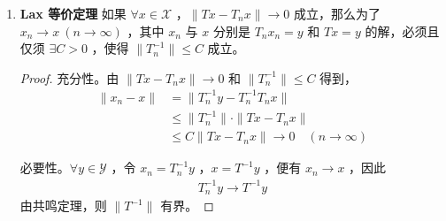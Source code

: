 \begin{enumerate}[leftmargin=2cm, label=\arabic*]
\begin{proof}
(2) $A$ 是满射，先证明 $R(A)$ 是闭的，事实上，$\forall w\in\overline{R}(A)$ ，$\exists v_n\in\mathscr{X}$ 使得 
\begin{equation*}
    w = \lim\limits_{n\to\infty} Av_n
\end{equation*}
则
\begin{align*}
    \delta\|v_{n+p} - v_n\| &\leqslant |a(v_{n+p} - v_n, v_{n+p}-v_n| \\
&= |(v_{n+p} - v_n, A(v_{n+p} - v_n) )|  \\
& \leqslant \|v_{n+p} - v_n\| \cdot \|Av_{n+p} - Av_n\|
\end{align*}
即得
\begin{align*}
    \|v_{n+p} - v_n\| \leqslant \frac{1}{\delta} \|Av_{n+p} - Av_n\| \to 0
\end{align*}
从而 $v_n$ 是基本列，因此 $\exists v^*\in\mathscr{X}$ ，使得 $v_n\to v^*$ ，并且有连续性得 $w = Av^*$ ，即得 $w\in R(A)$ ，于是 $R(A)$ 是闭集。再证明 $R(A)^{\perp} = \{\theta\}$ 。倘若 $w\in R(A)^{\perp}$ ，则
\begin{align*}
    (w, Av) = 0 \quad (\forall v\in\mathscr{X})
\end{align*}
即 $a(w, v) = 0$ ，特别取 $v = w$ ，即得
\begin{align*}
    \delta\|w\|^2 \leqslant |a(w, w)| = 0
\end{align*}
故而 $w =\theta$ ，则 $A$ 为满射。

(3) 再利用 \textbf{Banach 逆算子定理} ，$A^{-1}\in\mathscr{L}(\mathscr{X})$ ，因为
\begin{equation*}
    \delta\|x\|^2 \leqslant |a(x,x)| = |(x, Ax)| \leqslant \|x\| \cdot \|Ax\|
\end{equation*}
所以 $\delta\|x\|\leqslant \|Ax\|$ ，故而 $\|A^{-1}\|\leqslant \frac{1}{\delta}$ 。

\end{proof}
    \item \textbf{Lax 等价定理}  如果 $\forall x\in\mathscr{X}$ ，$\|Tx - T_n x\|\to 0$ 成立，那么为了 $x_n\to x\ (n\to\infty)$ ，其中 $x_n$ 与 $x$ 分别是 $T_nx_n= y$ 和 $Tx = y$ 的解，必须且仅须 $\exists C>0$ ，使得 $\|T^{-1}_n\|\leqslant C$ 成立。
\begin{proof}
    充分性。由 $\|Tx - T_nx\|\to 0$ 和 $\|T^{-1}_n\|\leqslant C$ 得到，
\begin{align*}
    \|x_n - x\| &= \|T^{-1}_n y - T^{-1}_n T_n x\| \\
    & \leqslant \|T^{-1}_n\|\cdot \|Tx - T_nx\| \\
    & \leqslant C\|Tx- T_nx\| \to 0 \quad (n\to\infty)
\end{align*}

    必要性。$\forall y\in\mathscr{Y}$ ，令 $x_n = T^{-1}_n y$ ，$x= T^{-1}y$ ，便有 $x_n\to x$ ，因此
\begin{align*}
    T^{-1}_n y \to T^{-1} y
\end{align*}
由共鸣定理，则 $\|T^{-1}\|$ 有界。
\end{proof}
\end{enumerate}
    
